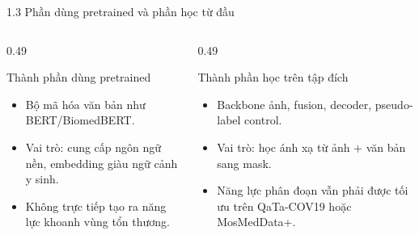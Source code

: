 \documentclass[aspectratio=169,11pt]{beamer}
\begin{document}
\begin{frame}{1.3 Phần dùng pretrained và phần học từ đầu}
  \begin{columns}[T,totalwidth=\textwidth]
    \begin{column}{0.49\textwidth}
      \begin{block}{Thành phần dùng pretrained}
        \begin{itemize}
          \item Bộ mã hóa văn bản như BERT/BiomedBERT.
          \item Vai trò: cung cấp ngôn ngữ nền, embedding giàu ngữ cảnh y sinh.
          \item Không trực tiếp tạo ra năng lực khoanh vùng tổn thương.
        \end{itemize}
      \end{block}
    \end{column}
    \begin{column}{0.49\textwidth}
      \begin{block}{Thành phần học trên tập đích}
        \begin{itemize}
          \item Backbone ảnh, fusion, decoder, pseudo-label control.
          \item Vai trò: học ánh xạ từ ảnh + văn bản sang mask.
          \item Năng lực phân đoạn vẫn phải được tối ưu trên QaTa-COV19 hoặc MosMedData+.
        \end{itemize}
      \end{block}
    \end{column}
  \end{columns}
\end{frame}
\end{document}
